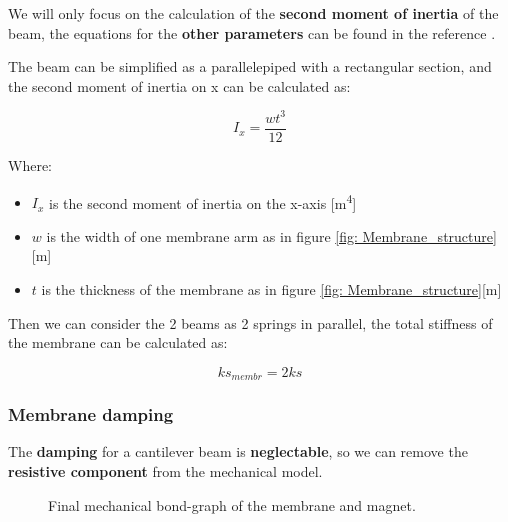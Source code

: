 We will only focus on the calculation of the \textbf{second moment of inertia} of the beam, the equations for the \textbf{other parameters} can be found in the reference \cite{statics_fixed_beam}.

\begin{samepage}
    The beam can be simplified as a parallelepiped with a rectangular section, and the second moment of inertia on x can be calculated as:
    \nopagebreak
    
    \begin{equation}
        \label{eq: Beam_inertia}
        I_x = \frac{w t^3}{12}
    \end{equation}
    \nopagebreak

    Where:
    \nopagebreak
    
    \begin{itemize}
        \item $I_x$ is the second moment of inertia on the x-axis [m\textsuperscript{4}]
        \item $w$ is the width of one membrane arm as in figure \ref{fig: Membrane_structure}[m]
        \item $t$ is the thickness of the membrane as in figure \ref{fig: Membrane_structure}[m]
    \end{itemize}
\end{samepage}

\pagebreak

\begin{samepage}
    Then we can consider the 2 beams as 2 springs in parallel, the total stiffness of the membrane can be calculated as:
    \nopagebreak

    \begin{equation}
        ks_{membr} = 2 ks
    \end{equation}
\end{samepage}


\begin{samepage}
    \subsubsection{Membrane damping}
    \nopagebreak

    The \textbf{damping} for a cantilever beam is \textbf{neglectable}, so we can remove the \textbf{resistive component} from the mechanical model.
    \nopagebreak

    \begin{figure}[H]
        \centering
        \resizebox{.45\linewidth}{!}{
                
        }
        \caption{Final mechanical bond-graph of the membrane and magnet.}
        \label{fig:Membrane_bond graph_without_damping}
    \end{figure}
\end{samepage}

